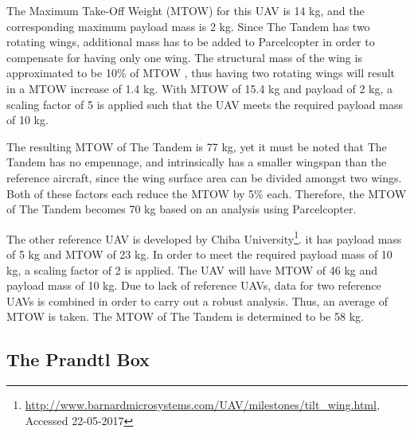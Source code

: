 The Maximum Take-Off Weight (MTOW) for this UAV is 14 kg, and the corresponding maximum payload mass is 2 kg. Since The Tandem has two rotating wings, additional mass has to be added to Parcelcopter in order to compensate for having only one wing. The structural mass of the wing is approximated to be 10\% of MTOW \cite{uav_weight}, thus having two rotating wings will result in a MTOW increase of 1.4 kg. With MTOW of 15.4 kg and payload of 2 kg, a scaling factor of 5 is applied such that the UAV meets the required payload mass of 10 kg. 

The resulting MTOW of The Tandem is 77 kg, yet it must be noted that The Tandem has no empennage, and intrinsically has a smaller wingspan than the reference aircraft, since the wing surface area can be divided amongst two wings. Both of these factors each reduce the MTOW by 5\% each\cite{uav_weight}. Therefore, the MTOW of The Tandem becomes 70 kg based on an analysis using Parcelcopter. 

The other reference UAV is developed by Chiba University\footnote{\url{http://www.barnardmicrosystems.com/UAV/milestones/tilt_wing.html}, Accessed 22-05-2017}. it has payload mass of 5 kg and MTOW of 23 kg. In order to meet the required payload mass of 10 kg, a scaling factor of 2 is applied. The UAV will have MTOW of 46 kg and payload mass of 10 kg. Due to lack of reference UAVs, data for two reference UAVs is combined in order to carry out a robust analysis. Thus, an average of MTOW is taken. The MTOW of The Tandem is determined to be 58 kg.

\subsection{The Prandtl Box}


